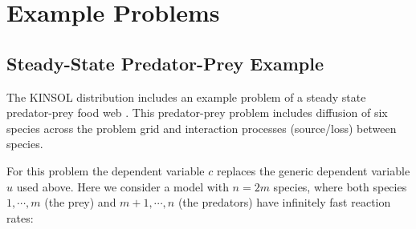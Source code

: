 \documentclass[11pt]{article}
\begin{document}
\section{Example Problems}
\subsection{Steady-State Predator-Prey Example}

The KINSOL distribution includes an example problem of a steady state
predator-prey food web \cite{Br86}. This predator-prey problem includes
diffusion of six species across the problem grid and interaction
processes (source/loss) between species.

For this problem the dependent variable $c$ replaces the generic
dependent variable $u$ used above. Here we consider a model with $n =
2m$ species, where both species \mbox{$1,\cdots , m$} (the prey) and
\mbox{$m+1,\cdots, n$} (the predators) have infinitely fast reaction
rates:
\end{document}
